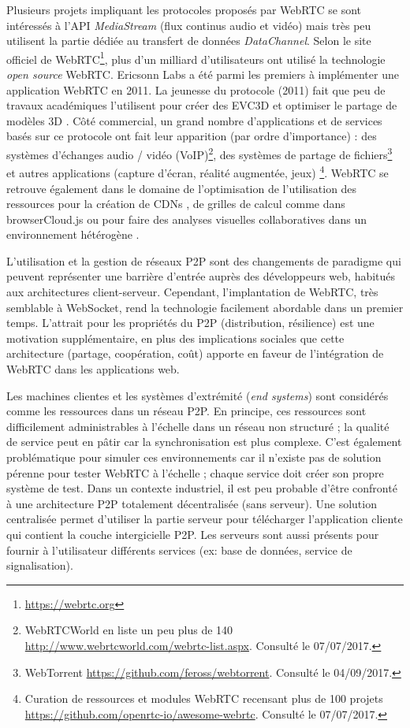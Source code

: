 Plusieurs projets impliquant les protocoles proposés par \gls{WebRTC} 
se sont intéressés à l'\gls{API} \textit{MediaStream} (flux continus audio 
et vidéo) mais très peu utilisent la partie dédiée au transfert de données 
\textit{DataChannel}. 
Selon le site officiel de WebRTC\footnote{\url{https://webrtc.org}}, plus d'un milliard 
d'utilisateurs ont utilisé la technologie \textit{open source} WebRTC. Ericsonn Labs 
a été parmi les premiers à implémenter une application WebRTC en 2011. 
La jeunesse du protocole (2011) fait que peu de travaux académiques 
l'utilisent pour créer des \gls{EVC3D} \cite{Desprat2015a,Steiakaki2016} et 
optimiser le partage de modèles 3D \cite{Koskela2014}. 
Côté commercial, un grand nombre d'applications et de services 
basés sur ce protocole ont fait leur apparition (par ordre d'importance) : 
des systèmes d'échanges audio / vidéo (VoIP)\footnote{WebRTCWorld en 
	liste un peu plus de 140 
	\url{http://www.webrtcworld.com/webrtc-list.aspx}. Consulté le 
	07/07/2017.}, des systèmes de partage de fichiers\footnote{WebTorrent 
	\url{https://github.com/feross/webtorrent}. Consulté le 04/09/2017.} et 
autres applications (capture d'écran, réalité augmentée, jeux)
\footnote{Curation de ressources et modules WebRTC 
	recensant plus de 100 projets 
	\url{https://github.com/openrtc-io/awesome-webrtc}. Consulté le 
	07/07/2017.}. WebRTC se retrouve également dans le domaine de l'optimisation 
	de l'utilisation des ressources pour la création de \glspl{CDN} 
	\cite{Zhang2013b}, de grilles de calcul comme dans
	browserCloud.js \cite{Dias2015a} ou pour faire des analyses visuelles 
	collaboratives dans un environnement hétérogène \cite{Li2015}.


L'utilisation et la gestion de réseaux \gls{P2P} sont des changements de paradigme 
qui peuvent représenter une 
barrière d'entrée auprès des développeurs web, habitués aux architectures 
client-serveur. 
Cependant, l'implantation de WebRTC, très semblable à WebSocket, rend la 
technologie facilement abordable dans un premier temps. L'attrait pour les 
propriétés du \gls{P2P} (distribution, résilience) est une motivation 
supplémentaire, en plus des implications sociales que cette architecture (partage, 
coopération, coût) apporte en faveur de l'intégration de WebRTC dans les 
applications web.

Les machines clientes et les systèmes d'extrémité (\textit{end systems}) 
sont considérés comme \og les ressources\fg{} dans un réseau 
\gls{P2P}. 
En principe, ces ressources sont difficilement administrables à l'échelle 
dans un réseau non structuré ; la qualité de service peut en pâtir car la 
synchronisation est plus complexe. C'est également problématique pour simuler 
ces environnements car il n'existe pas de solution pérenne pour tester WebRTC à 
l'échelle ; chaque service doit créer son propre système de test. 
Dans un contexte industriel, il est peu probable d'être confronté à une architecture 
\gls{P2P} totalement décentralisée (sans serveur). Une solution centralisée permet 
d'utiliser la partie serveur pour télécharger l'application cliente qui contient la 
couche intergicielle \gls{P2P}. 
Les serveurs sont aussi présents pour fournir à l'utilisateur différents services (ex: 
base de données, service de signalisation). 

